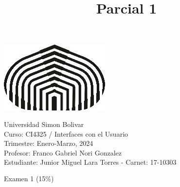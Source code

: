 \documentclass[a4paper,12pt]{article}
\title{Parcial 1}
\begin{document}
\begin{center}
\par \includegraphics[scale=1]{USB} \par
Universidad Simon Bolivar \\ Curso: CI4325 / Interfaces con el Usuario \\ Trimestre: Enero-Marzo, 2024 \\ Profesor: Franco Gabriel Nori Gonzalez \\ Estudiante: Junior Miguel Lara Torres - Carnet: 17-10303 \\
\end{center}

\begin{center}
Examen 1 (15\%)
\end{center}
\end{document}
